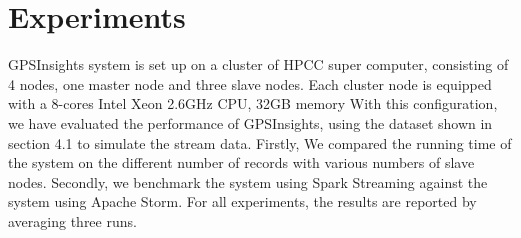 \documentclass{acm_proc_article-sp}
\begin{document}
%
%		
%

\section{Experiments}
	GPSInsights system is set up on a cluster of HPCC super computer, consisting of 4 nodes, one master node and three slave nodes. Each cluster node is equipped with a  8-cores Intel Xeon 2.6GHz CPU, 32GB memory 
	With this configuration, we have evaluated the performance of GPSInsights, using the dataset shown in section 4.1 to simulate the stream data. Firstly, We compared the running time of the system on the different number of records with various numbers of slave nodes. Secondly, we benchmark the system using Spark Streaming against the system using Apache Storm. For all experiments, the results are reported by averaging three runs. 
	
\end{document}
